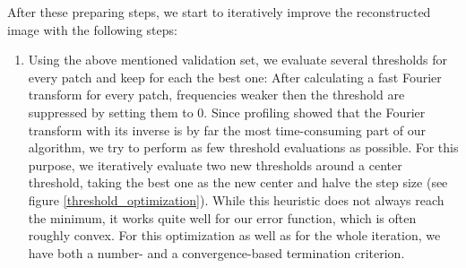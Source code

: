 \documentclass[10pt,conference,compsocconf]{IEEEtran}
\begin{document}
After these preparing steps, we start to iteratively improve the reconstructed image with the following steps:
\begin{enumerate}
\item Using the above mentioned validation set, we evaluate several thresholds for every patch and keep for each the best one: After calculating a fast Fourier transform for every patch, frequencies weaker then the threshold are suppressed by setting them to 0. Since profiling showed that the Fourier transform with its inverse is by far the most time-consuming part of our algorithm, we try to perform as few threshold evaluations as possible. For this purpose, we iteratively evaluate two new thresholds around a center threshold, taking the best one as the new center and halve the step size (see figure \ref{threshold_optimization}). While this heuristic does not always reach the minimum, it works quite well for our error function, which is often roughly convex. For this optimization as well as for the whole iteration, we have both a number- and a convergence-based termination criterion.


\end{enumerate}
\end{document}
